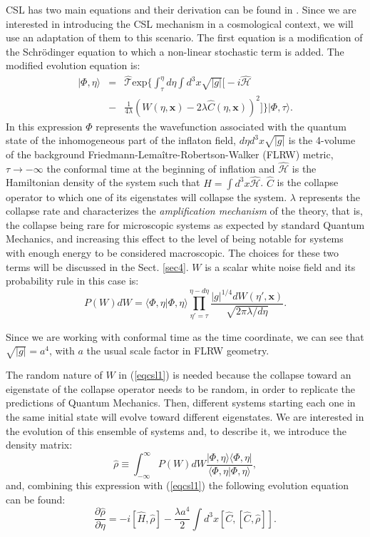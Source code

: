 \documentclass[baaa]{baaa}
\begin{document}
CSL has two main equations and their derivation can be found in \cite{Pearle2012}. Since we are interested in introducing the CSL mechanism in a cosmological context, we will use an adaptation of them to this scenario. The first equation is a modification of the Schrödinger equation to which a non-linear stochastic term is added. The modified evolution equation is:
\begin{eqnarray} \label{eqcsl1}
    |\Phi,\eta\rangle &=& \hat{\mathcal{T}} \text{exp} \bigg \{ \int_{\tau}^{\eta} d\eta \int d^3x \sqrt{|g|} \bigg [ -i\hat{\mathcal{H}}\nonumber 
    \\ 
    &-&
    \frac{1}{4\lambda} (W(\eta,\mathbf{x})-2\lambda \hat{C}(\eta,\mathbf{x}))^2 \bigg ] \bigg \} |\Phi,\tau\rangle .
\end{eqnarray}
In this expression $\Phi$ represents the wavefunction associated with the quantum state of the inhomogeneous part of the inflaton field, $d\eta d^3x\sqrt{|g|}$ is the 4-volume of the background Friedmann-Lemaître-Robertson-Walker (FLRW) metric, $\tau \rightarrow -\infty$ the conformal time at the beginning of inflation and $\hat{\mathcal{H}}$ is the Hamiltonian density of the system such that $\hat{H}=\int d^3x\hat{\mathcal{H}}$. $\hat{C}$ is the collapse operator to which one of its eigenstates will collapse the system. $\lambda$ represents the collapse rate and characterizes the \textit{amplification mechanism} of the theory, that is, the collapse being rare for microscopic systems as expected by standard Quantum Mechanics, and increasing this effect to the level of being notable for systems with enough energy to be considered macroscopic. The choices for these two terms will be discussed in the Sect. \ref{sec4}.  $W$ is a scalar white noise field and its probability rule in this case is:
\begin{equation}
    P(W)dW=\langle\Phi,\eta|\Phi,\eta\rangle \prod_{\eta'=\tau}^{\eta-d\eta}\frac{|g|^{1/4}dW(\eta',\mathbf{x})}{\sqrt{2\pi\lambda/d\eta}} .
\end{equation}

Since we are working with conformal time as the time coordinate, we can see that $\sqrt{|g|}=a^4$, with $a$ the usual scale factor in FLRW geometry.

The random nature of $W$ in (\ref{eqcsl1}) is needed because the collapse toward an eigenstate of the collapse operator needs to be random, in order to replicate the predictions of Quantum Mechanics. Then, different systems starting each one in the same initial state will evolve toward different eigenstates. We are interested in the evolution of this ensemble of systems and, to describe it, we introduce the density matrix:
\begin{equation}
    \hat{\rho} \equiv \int_{-\infty}^{\infty} P(W)dW \frac{|\Phi,\eta\rangle\langle\Phi,\eta|}{\langle\Phi,\eta|\Phi,\eta\rangle} ,
\end{equation}
 and, combining this expression with (\ref{eqcsl1}) the following evolution equation can be found:
 \begin{equation}
     \frac{\partial\hat{\rho}}{\partial\eta} = - i [\hat{H},\hat{\rho}] - \frac{\lambda a^4}{2} \int d^3x [\hat{C},[\hat{C},\hat{\rho}]].
 \end{equation}
\end{document}
